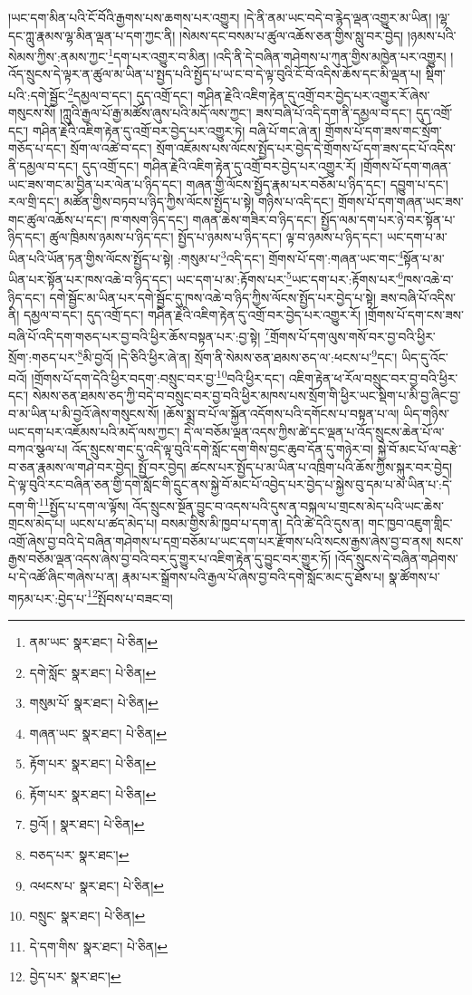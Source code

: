 །ཡང་དག་མིན་པའི་ངོ་བོའི་རྒྱགས་པས་ཆགས་པར་འགྱུར། །དེ་ནི་ནམ་ཡང་བདེ་བ་རྙེད་ལྡན་འགྱུར་མ་ཡིན། །ལྷ་དང་ཀླུ་རྣམས་ལྷ་མིན་ལྡན་པ་དག་ཀྱང་ནི། །སེམས་དང་བསམ་པ་ཚུལ་འཆོས་ཅན་གྱིས་སླུ་བར་བྱེད། །ཉམས་པའི་སེམས་ཀྱིས་:ནམས་ཀྱང་\footnote{ནམ་ཡང་  སྣར་ཐང་།  པེ་ཅིན། }དག་པར་འགྱུར་བ་མིན། །འདི་ནི་དེ་བཞིན་གཤེགས་པ་ཀུན་གྱིས་མཁྱེན་པར་འགྱུར། །འོད་སྲུངས་དེ་ལྟར་ན་ཚུལ་མ་ཡིན་པ་སྤྱད་པའི་སྤྱོད་པ་ཡ་ང་བ་དེ་ལྟ་བུའི་ངོ་བོ་འདིས་ཆོས་དང་མི་ལྡན་པ། སྡིག་པའི་:དགེ་སྦྱོང་\footnote{དགེ་སློང་  སྣར་ཐང་།  པེ་ཅིན། }དམྱལ་བ་དང་། དུད་འགྲོ་དང་། གཤིན་རྗེའི་འཇིག་རྟེན་དུ་འགྲོ་བར་བྱེད་པར་འགྱུར་རོ་ཞེས་གསུངས་སོ། །ཀླུའི་རྒྱལ་པོ་རྒྱ་མཚོས་ཞུས་པའི་མདོ་ལས་ཀྱང་། ཟས་བཞི་པོ་འདི་དག་ནི་དམྱལ་བ་དང་། དུད་འགྲོ་དང་། གཤིན་རྗེའི་འཇིག་རྟེན་དུ་འགྲོ་བར་བྱེད་པར་འགྱུར་ཏེ། བཞི་པོ་གང་ཞེ་ན། གྲོགས་པོ་དག་ཟས་གང་སྲོག་གཅོད་པ་དང་། སྲོག་ལ་འཚེ་བ་དང་། སྲོག་འཇོམས་པས་ལོངས་སྤྱོད་པར་བྱེད་དེ་གྲོགས་པོ་དག་ཟས་དང་པོ་འདིས་ནི་དམྱལ་བ་དང་། དུད་འགྲོ་དང་། གཤིན་རྗེའི་འཇིག་རྟེན་དུ་འགྲོ་བར་བྱེད་པར་འགྱུར་རོ། །གྲོགས་པོ་དག་གཞན་ཡང་ཟས་གང་མ་བྱིན་པར་ལེན་པ་ཉིད་དང་། གཞན་གྱི་ལོངས་སྤྱོད་རྣམ་པར་བཅོམ་པ་ཉིད་དང་། དབྱུག་པ་དང་། རལ་གྲི་དང་། མཚོན་གྱིས་བཏབ་པ་ཉིད་ཀྱིས་ལོངས་སྤྱོད་པ་སྟེ། གཉིས་པ་འདི་དང་། གྲོགས་པོ་དག་གཞན་ཡང་ཟས་གང་ཚུལ་འཆོས་པ་དང་། ཁ་གསག་ཉིད་དང་། གཞན་ཆེས་གཟིར་བ་ཉིད་དང་། སྤྱོད་ལམ་དག་པར་ཉེ་བར་སྟོན་པ་ཉིད་དང་། ཚུལ་ཁྲིམས་ཉམས་པ་ཉིད་དང་། སྤྱོད་པ་ཉམས་པ་ཉིད་དང་། ལྟ་བ་ཉམས་པ་ཉིད་དང་། ཡང་དག་པ་མ་ཡིན་པའི་ཡོན་ཏན་གྱིས་ལོངས་སྤྱོད་པ་སྟེ། :གསུམ་པ་\footnote{གསུམ་པོ་  སྣར་ཐང་།  པེ་ཅིན། }འདི་དང་། གྲོགས་པོ་དག་:གཞན་ཡང་གང་\footnote{གཞན་ཡང་  སྣར་ཐང་།  པེ་ཅིན། }སྟོན་པ་མ་ཡིན་པར་སྟོན་པར་ཁས་འཆེ་བ་ཉིད་དང་། ཡང་དག་པ་མ་:རྟོགས་པར་\footnote{རྟོག་པར་  སྣར་ཐང་།  པེ་ཅིན། }ཡང་དག་པར་:རྟོགས་པར་\footnote{རྟོག་པར་  སྣར་ཐང་།  པེ་ཅིན། }ཁས་འཆེ་བ་ཉིད་དང་། དགེ་སྦྱོང་མ་ཡིན་པར་དགེ་སྦྱོང་དུ་ཁས་འཆེ་བ་ཉིད་ཀྱིས་ལོངས་སྤྱོད་པར་བྱེད་པ་སྟེ། ཟས་བཞི་པོ་འདིས་ནི། དམྱལ་བ་དང་། དུད་འགྲོ་དང་། གཤིན་རྗེའི་འཇིག་རྟེན་དུ་འགྲོ་བར་བྱེད་པར་འགྱུར་རོ། །གྲོགས་པོ་དག་ངས་ཟས་བཞི་པོ་འདི་དག་གཅད་པར་བྱ་བའི་ཕྱིར་ཆོས་བསྟན་པར་:བྱ་སྟེ། \footnote{བྱའོ། །   སྣར་ཐང་།  པེ་ཅིན། }གྲོགས་པོ་དག་ལུས་གསོ་བར་བྱ་བའི་ཕྱིར་སྲོག་:གཅད་པར་\footnote{བཅད་པར་  སྣར་ཐང་། }མི་བྱའོ། །དེ་ཅིའི་ཕྱིར་ཞེ་ན། སྲོག་ནི་སེམས་ཅན་ཐམས་ཅད་ལ་:ཕངས་པ་\footnote{འཕངས་པ་  སྣར་ཐང་།  པེ་ཅིན། }དང་། ཡིད་དུ་འོང་བའོ། །གྲོགས་པོ་དག་དེའི་ཕྱིར་བདག་:བསྲུང་བར་བྱ་\footnote{བསྲུང་  སྣར་ཐང་།  པེ་ཅིན། }བའི་ཕྱིར་དང་། འཇིག་རྟེན་ཕ་རོལ་བསྲུང་བར་བྱ་བའི་ཕྱིར་དང་། སེམས་ཅན་ཐམས་ཅད་ཀྱི་བདེ་བ་བསྲུང་བར་བྱ་བའི་ཕྱིར་མཁས་པས་སྲོག་གི་ཕྱིར་ཡང་སྡིག་པ་མི་བྱ་ཞིང་བྱ་བ་མ་ཡིན་པ་མི་བྱའོ་ཞེས་གསུངས་སོ། །ཆོས་སྨྲ་བ་པོ་ལ་སྐྱོན་འདོགས་པའི་དགོངས་པ་བསྟན་པ་ལ། ཡིད་གཉིས་ཡང་དག་པར་འཇོམས་པའི་མདོ་ལས་ཀྱང་། དེ་ལ་བཅོམ་ལྡན་འདས་ཀྱིས་ཚེ་དང་ལྡན་པ་འོད་སྲུངས་ཆེན་པོ་ལ་བཀའ་སྩལ་པ། འོད་སྲུངས་གང་དུ་འདི་ལྟ་བུའི་དགེ་སློང་དག་གིས་བྱང་ཆུབ་དོན་དུ་གཉེར་བ། སྐྱེ་བོ་མང་པོ་ལ་བརྩེ་བ་ཅན་རྣམས་ལ་གཤེ་བར་བྱེད། སྤྱོ་བར་བྱེད། ཚངས་པར་སྤྱོད་པ་མ་ཡིན་པ་འཁྲིག་པའི་ཆོས་ཀྱིས་སྐུར་བར་བྱེད། དེ་ལྟ་བུའི་རང་བཞིན་ཅན་གྱི་དགེ་སློང་གི་དྲུང་ནས་སྐྱེ་བོ་མང་པོ་འབྱེད་པར་བྱེད་པ་སྐྱེས་བུ་དམ་པ་མ་ཡིན་པ་:དེ་དག་གི་\footnote{དེ་དག་གིས་  སྣར་ཐང་།  པེ་ཅིན། }སྤྱོད་པ་དག་ལ་ལྟོས། འོད་སྲུངས་སྔོན་བྱུང་བ་འདས་པའི་དུས་ན་བསྐལ་པ་གྲངས་མེད་པའི་ཡང་ཆེས་གྲངས་མེད་པ། ཡངས་པ་ཚད་མེད་པ། བསམ་གྱིས་མི་ཁྱབ་པ་དག་ན། དེའི་ཚེ་དེའི་དུས་ན། གང་ཁྱབ་འཇུག་གླིང་འགྲོ་ཞེས་བྱ་བའི་དེ་བཞིན་གཤེགས་པ་དགྲ་བཅོམ་པ་ཡང་དག་པར་རྫོགས་པའི་སངས་རྒྱས་ཞེས་བྱ་བ་ནས། སངས་རྒྱས་བཅོམ་ལྡན་འདས་ཞེས་བྱ་བའི་བར་དུ་གྱུར་པ་འཇིག་རྟེན་དུ་བྱུང་བར་གྱུར་ཏོ། །འོད་སྲུངས་དེ་བཞིན་གཤེགས་པ་དེ་འཚོ་ཞིང་གཞེས་པ་ན། རྣམ་པར་སྒྲོགས་པའི་རྒྱལ་པོ་ཞེས་བྱ་བའི་དགེ་སློང་མང་དུ་ཐོས་པ། སྣ་ཚོགས་པ་གཏམ་པར་:བྱེད་པ་\footnote{བྱེད་པར་  སྣར་ཐང་། }སྤོབས་པ་བཟང་བ། 